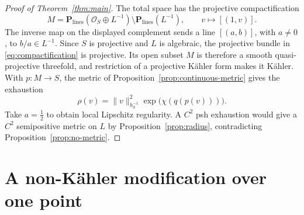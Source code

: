 \documentclass[11pt]{amsart}
\theoremstyle{definition}
\theoremstyle{remark}
\numberwithin{equation}{section}
\newcommand{\PP}{\mathbf P}
\newcommand{\OO}{\mathcal O}
\begin{document}
\begin{proof}[Proof of Theorem~\ref{thm:main}]\label{sec:conclusion}
The total space has the projective compactification
\begin{equation}\label{eq:compactification}
 M=\PP_{\mathrm{lines}}(\OO_S\oplus L^{-1})
 \setminus\PP_{\mathrm{lines}}(L^{-1}),\qquad
 v\longmapsto[(1,v)].
\end{equation}
The inverse map on the displayed complement sends a line
$[(a,b)]$, with $a\ne0$, to $b/a\in L^{-1}$.
Since $S$ is projective and $L$ is algebraic, the projective bundle
in \eqref{eq:compactification} is projective. Its open subset $M$
is therefore a smooth quasi-projective threefold, and restriction
of a projective K\"ahler form makes it K\"ahler. With
$p:M\to S$, the metric of Proposition~\ref{prop:continuous-metric}
gives the exhaustion
\begin{equation}\label{eq:explicit-exhaustion}
 \rho(v)=\|v\|_{h_0^{-1}}^2\exp\bigl(\chi(q(p(v)))\bigr).
\end{equation}
Take $a=\tfrac12$ to obtain local Lipschitz regularity.
A $C^2$ psh exhaustion would give a $C^2$ semipositive metric on $L$
by Proposition~\ref{prop:radius}, contradicting
Proposition~\ref{prop:no-metric}.
\end{proof}

\section{A non-K\"ahler modification over one point}\label{sec:nonkahler}
\end{document}

